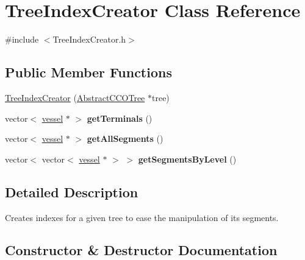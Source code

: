 \hypertarget{class_tree_index_creator}{}\section{Tree\+Index\+Creator Class Reference}
\label{class_tree_index_creator}


{\ttfamily \#include $<$Tree\+Index\+Creator.\+h$>$}

\subsection*{Public Member Functions}
\begin{DoxyCompactItemize}
\item 
\mbox{\hyperlink{class_tree_index_creator_ab8386c638c09069e53680e7461d76d5c}{Tree\+Index\+Creator}} (\mbox{\hyperlink{class_abstract_c_c_o_tree}{Abstract\+C\+C\+O\+Tree}} $\ast$tree)
\item 
\mbox{\label{class_tree_index_creator_aaa96f17bfc82043b0ab3f78f9bdce9b5}} 
vector$<$ \mbox{\hyperlink{structvessel}{vessel}} $\ast$ $>$ {\bfseries get\+Terminals} ()
\item 
\mbox{\label{class_tree_index_creator_aad7cac2dec20987a7099b1e62e5d89e9}} 
vector$<$ \mbox{\hyperlink{structvessel}{vessel}} $\ast$ $>$ {\bfseries get\+All\+Segments} ()
\item 
\mbox{\label{class_tree_index_creator_a19b04a2a699a2dc613c7a8c1aef204b9}} 
vector$<$ vector$<$ \mbox{\hyperlink{structvessel}{vessel}} $\ast$ $>$ $>$ {\bfseries get\+Segments\+By\+Level} ()
\end{DoxyCompactItemize}


\subsection{Detailed Description}
Creates indexes for a given tree to ease the manipulation of its segments. 

\subsection{Constructor \& Destructor Documentation}
\mbox{\label{class_tree_index_creator_ab8386c638c09069e53680e7461d76d5c}} 
